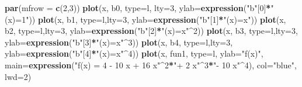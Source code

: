 \documentclass[
]{book}
\newenvironment{Shaded}{\begin{snugshade}}{\end{snugshade}}
\newcommand{\AttributeTok}[1]{\textcolor[rgb]{0.13,0.29,0.53}{#1}}
\newcommand{\DecValTok}[1]{\textcolor[rgb]{0.00,0.00,0.81}{#1}}
\newcommand{\FunctionTok}[1]{\textcolor[rgb]{0.13,0.29,0.53}{\textbf{#1}}}
\newcommand{\NormalTok}[1]{#1}
\newcommand{\SpecialCharTok}[1]{\textcolor[rgb]{0.81,0.36,0.00}{\textbf{#1}}}
\newcommand{\StringTok}[1]{\textcolor[rgb]{0.31,0.60,0.02}{#1}}
\begin{document}
\begin{Shaded}
\begin{Highlighting}[]
\FunctionTok{par}\NormalTok{(}\AttributeTok{mfrow =} \FunctionTok{c}\NormalTok{(}\DecValTok{2}\NormalTok{,}\DecValTok{3}\NormalTok{))}
\FunctionTok{plot}\NormalTok{(x, b0, }\AttributeTok{type=}\StringTok{\textquotesingle{}l\textquotesingle{}}\NormalTok{, }\AttributeTok{lty=}\DecValTok{3}\NormalTok{, }\AttributeTok{ylab=}\FunctionTok{expression}\NormalTok{(}\StringTok{"b"}\NormalTok{[}\DecValTok{0}\NormalTok{]}\SpecialCharTok{*}\StringTok{"(x)=1"}\NormalTok{))}
\FunctionTok{plot}\NormalTok{(x, b1, }\AttributeTok{type=}\StringTok{\textquotesingle{}l\textquotesingle{}}\NormalTok{,}\AttributeTok{lty=}\DecValTok{3}\NormalTok{, }\AttributeTok{ylab=}\FunctionTok{expression}\NormalTok{(}\StringTok{"b"}\NormalTok{[}\DecValTok{1}\NormalTok{]}\SpecialCharTok{*}\StringTok{"(x)=x"}\NormalTok{))}
\FunctionTok{plot}\NormalTok{(x, b2, }\AttributeTok{type=}\StringTok{\textquotesingle{}l\textquotesingle{}}\NormalTok{,}\AttributeTok{lty=}\DecValTok{3}\NormalTok{, }\AttributeTok{ylab=}\FunctionTok{expression}\NormalTok{(}\StringTok{"b"}\NormalTok{[}\DecValTok{2}\NormalTok{]}\SpecialCharTok{*}\StringTok{"(x)=x"}\SpecialCharTok{\^{}}\DecValTok{2}\NormalTok{))}
\FunctionTok{plot}\NormalTok{(x, b3, }\AttributeTok{type=}\StringTok{\textquotesingle{}l\textquotesingle{}}\NormalTok{,}\AttributeTok{lty=}\DecValTok{3}\NormalTok{, }\AttributeTok{ylab=}\FunctionTok{expression}\NormalTok{(}\StringTok{"b"}\NormalTok{[}\DecValTok{3}\NormalTok{]}\SpecialCharTok{*}\StringTok{"(x)=x"}\SpecialCharTok{\^{}}\DecValTok{3}\NormalTok{))}
\FunctionTok{plot}\NormalTok{(x, b4, }\AttributeTok{type=}\StringTok{\textquotesingle{}l\textquotesingle{}}\NormalTok{,}\AttributeTok{lty=}\DecValTok{3}\NormalTok{, }\AttributeTok{ylab=}\FunctionTok{expression}\NormalTok{(}\StringTok{"b"}\NormalTok{[}\DecValTok{4}\NormalTok{]}\SpecialCharTok{*}\StringTok{"(x)=x"}\SpecialCharTok{\^{}}\DecValTok{4}\NormalTok{))}
\FunctionTok{plot}\NormalTok{(x, fun1, }\AttributeTok{type=}\StringTok{\textquotesingle{}l\textquotesingle{}}\NormalTok{, }\AttributeTok{ylab=}\StringTok{"f(x)"}\NormalTok{, }\AttributeTok{main=}\FunctionTok{expression}\NormalTok{(}\StringTok{"f(x) =  4 {-} 10 x + 16 x"}\SpecialCharTok{\^{}}\DecValTok{2}\SpecialCharTok{*}\StringTok{"+ 2 x"}\SpecialCharTok{\^{}}\DecValTok{3}\SpecialCharTok{*}\StringTok{"{-} 10 x"}\SpecialCharTok{\^{}}\DecValTok{4}\NormalTok{), }\AttributeTok{col=}\StringTok{"blue"}\NormalTok{, }\AttributeTok{lwd=}\DecValTok{2}\NormalTok{)}
\end{Highlighting}
\end{Shaded}
\end{document}
